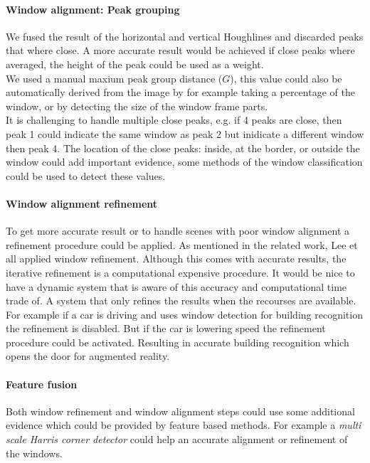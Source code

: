 \paragraph{Window alignment: Peak grouping}
We fused the result of the horizontal and vertical Houghlines and discarded
peaks that where close.  A more accurate result would be achieved if close peaks
where averaged, the height of the peak could be used as a weight.\\
We used a manual maxium peak group distance ($G$), this value could also be automatically derived from the image
by for example taking a percentage of the window, or by detecting the size of the window frame parts.\\ 
It is challenging to handle multiple close peaks, e.g. if 4 peaks
are close, then peak 1 could indicate the same window as peak 2 but inidicate a different window then peak 4. The location of the close peaks: inside, at the border, or outside the window could add important evidence, some methods of the window classification could be used to detect these values.

\paragraph{Window alignment refinement}
To get more accurate result or to handle scenes with poor window alignment a refinement procedure could be applied.
As mentioned in the related work, Lee et all \cite{Lee_extraction} applied window refinement.
Although this comes with accurate results, the iterative refinement is a
computational expensive procedure. 
It would be nice to have a dynamic system that is aware of this 
accuracy and computational time trade of. A system that only refines the results when the recourses are available.
For example if a car is driving and uses window detection for building recognition the refinement is disabled.
But if the car is lowering speed the refinement procedure could be activated.
Resulting in accurate building recognition which opens the door for augmented reality.

\paragraph{Feature fusion}
Both window refinement and window alignment steps could use some additional
evidence which could be provided by feature based methods.  For example a
\emph{multi scale Harris corner detector} could help an accurate alignment or
refinement of the windows.

